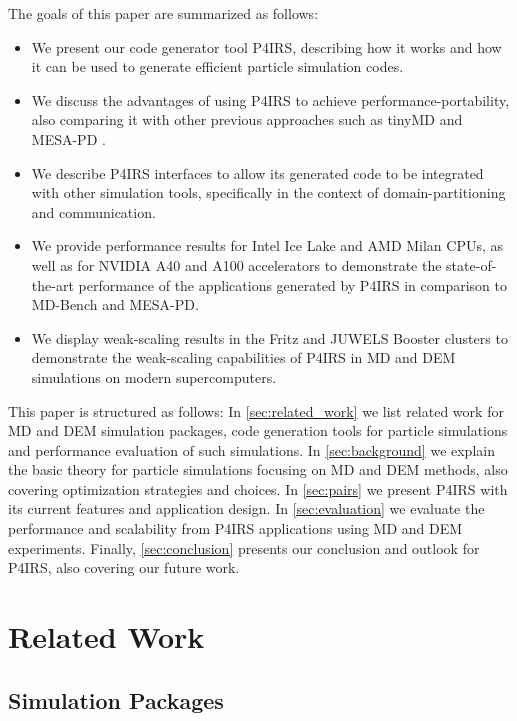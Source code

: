 \documentclass[preprint,12pt]{elsarticle}
\begin{document}
The goals of this paper are summarized as follows:
\begin{itemize}
	\item We present our code generator tool P4IRS, describing how it works and how it can be used to generate efficient particle simulation codes.
	\item We discuss the advantages of using P4IRS to achieve performance-portability, also comparing it with other previous approaches such as tinyMD \cite{tinymd} and MESA-PD \cite{mesapd1,mesapd2}.
	\item We describe P4IRS interfaces to allow its generated code to be integrated with other simulation tools, specifically in the context of domain-partitioning and communication.
	\item We provide performance results for Intel Ice Lake and AMD Milan CPUs, as well as for NVIDIA A40 and A100 accelerators to demonstrate the state-of-the-art performance of the applications generated by P4IRS in comparison to MD-Bench and MESA-PD.
	\item We display weak-scaling results in the Fritz and JUWELS Booster clusters to demonstrate the weak-scaling capabilities of P4IRS in MD and DEM simulations on modern supercomputers.
\end{itemize}

This paper is structured as follows: In \autoref{sec:related_work} we list related work for MD and DEM simulation packages, code generation tools for particle simulations and performance evaluation of such simulations. In \autoref{sec:background} we explain the basic theory for particle simulations focusing on MD and DEM methods, also covering optimization strategies and choices. In \autoref{sec:pairs} we present P4IRS with its current features and application design. In \autoref{sec:evaluation} we evaluate the performance and scalability from P4IRS applications using \ac{MD} and \ac{DEM} experiments. Finally, \autoref{sec:conclusion} presents our conclusion and outlook for P4IRS, also covering our future work.

\section{Related Work}
\label{sec:related_work}

\subsection{Simulation Packages}
\label{sec:packages}
\end{document}
